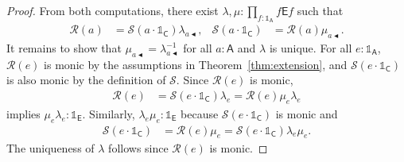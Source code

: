 \documentclass{amsart}
\newcommand{\acat}[1]{\mathsf{#1}}
\numberwithin{lstfloat}{section}
\newcommand{\srcfunc}{\mathbin{\blacktriangleleft}}
\newcommand{\src}[1]{#1\srcfunc}
\newcommand{\one}{\mathbb{1}}
\newcommand{\func}[1]{\mathcal{#1}}
\newcommand{\fR}{\func{R}}
\newcommand{\fS}{\func{S}}
\theoremstyle{definition}
\theoremstyle{remark}
\numberwithin{equation}{section}
\begin{document}
\begin{proof}
  From both computations, there exist $\lambda,\mu : \prod_{f:\one_{\acat{A}}}
  f\acat{E}f$ such that 
  \begin{align*}
    \fR(a) &= \fS(a \cdot\one_{\acat{C}}) \lambda_{\src{a}}, 
    & \fS(a \cdot\one_{\acat{C}}) &= \fR(a) \mu_{\src{a}}. 
  \end{align*}
  It remains to show that $\mu_{\src{a}} = \lambda_{\src{a}}^{-1}$ for all
  $a:\acat{A}$ and $\lambda$ is unique. For all $e:\one_{\acat{A}}$, 
  $\fR(e)$ is monic by the assumptions in Theorem~\ref{thm:extension}, and 
  $\fS(e\cdot \one_{\acat{C}})$ is also monic by the definition of $\fS$.
  Since $\fR(e)$ is monic, 
  \begin{align*}
    \fR(e) &= \fS(e \cdot\one_{\acat{C}}) \lambda_{e} = \fR(e)\mu_{e}\lambda_{e}
  \end{align*}
  implies $\mu_{e}\lambda_{e} : \one_{\acat{E}}$. Similarly, $\lambda_{e} \mu_{e}
  : \one_{\acat{E}}$ because $\fS(e\cdot\one_{\acat{C}})$ is monic and
  \begin{align*}
    \fS(e \cdot\one_{\acat{C}}) &= \fR(e) \mu_{e} = \fS(e \cdot\one_{\acat{C}}) \lambda_{e} \mu_{e} .
  \end{align*}
  The uniqueness of $\lambda$ follows since $\fR(e)$ is monic.
\end{proof}
\end{document}
